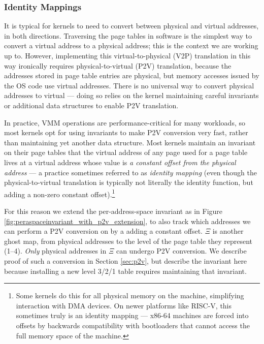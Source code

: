 \subsubsection{Identity Mappings}
\label{subsec:identitymappings}
It is typical for kernels to need to convert between physical and virtual addresses, in both directions.
Traversing the page tables in software is the simplest way to convert a virtual address to a physical address; this is the context we are working up to.
However, implementing this virtual-to-physical (V2P) translation in this way ironically requires physical-to-virtual (P2V) translation,
because the addresses stored in page table entries are physical, but memory accesses issued by the OS code use virtual addresses.
There is no universal way to convert physical addresses to virtual --- doing so relies on the kernel maintaining careful invariants or
additional data structures to enable P2V translation.

In practice, VMM operations are performance-critical for many workloads, so most kernels opt for using invariants to make P2V conversion very fast,
rather than maintaining yet another data structure.
Most kernels maintain an invariant on their page tables that the virtual address of any page used for a page table lives at a virtual address
whose value is \emph{a constant offset from the physical address} --- a practice sometimes referred to as \emph{identity mapping} 
(even though the physical-to-virtual translation
is typically not literally the identity function, but adding a non-zero constant offset).\footnote{Some kernels do this for all physical memory on the machine, simplifying interaction
with DMA devices.
On newer platforms like RISC-V, this sometimes truly is an identity mapping ---
x86-64 machines are forced into offsets by backwards compatibility with bootloaders that cannot access the full memory space of the
machine.
}

For this reason we extend the per-address-space invariant as in Figure \ref{fig:peraspaceinvariant_with_p2v_extension}, to also track which
addresses we can perform a P2V conversion on by a adding a constant offset.
$\Xi$ is another ghost map, from physical addresses to the level of the page table they represent (1--4).
\emph{Only} physical addresses in $\Xi$ can undergo P2V conversion. We describe proof of such a conversion in Section \ref{sec:p2v},
but describe the invariant here because installing a new level 3/2/1 table requires maintaining that invariant.

